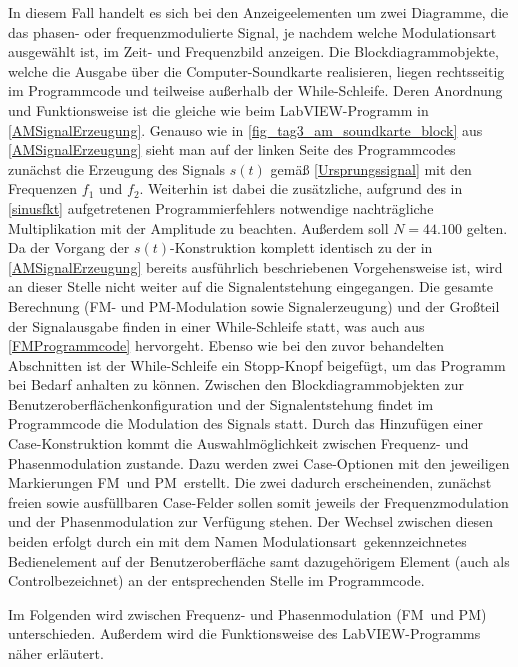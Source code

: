 \documentclass[
a4paper,
12pt,
pagesize,
ngerman
]{scrartcl}
\begin{document}
	\noindent In diesem Fall handelt es sich bei den Anzeigeelementen um zwei Diagramme, die das phasen- oder frequenzmodulierte Signal, je nachdem welche Modulationsart ausgewählt ist, im Zeit- und Frequenzbild anzeigen. 
	Die Blockdiagrammobjekte, welche die Ausgabe über die Computer-Soundkarte realisieren, liegen rechtsseitig im Programmcode und teilweise außerhalb der While-Schleife. 
	Deren Anordnung und Funktionsweise ist die gleiche wie beim LabVIEW-Programm in \cref{AMSignalErzeugung}. 
	Genauso wie in \cref{fig_tag3_am_soundkarte_block} aus \cref{AMSignalErzeugung} sieht man auf der linken Seite des Programmcodes zunächst die Erzeugung des Signals $s(t)$ gemäß \cref{Ursprungssignal} mit den Frequenzen $f_1$ und $f_2$. 
	Weiterhin ist dabei die zusätzliche, aufgrund des in \cref{sinusfkt} aufgetretenen Programmierfehlers notwendige nachträgliche Multiplikation mit der Amplitude zu beachten. 
	Außerdem soll $N = 44.100$ gelten. 
	Da der Vorgang der $s(t)$-Konstruktion komplett identisch zu der in \cref{AMSignalErzeugung} bereits ausführlich beschriebenen Vorgehensweise ist, wird an dieser Stelle nicht weiter auf die Signalentstehung eingegangen. 
	Die gesamte Berechnung (FM- und PM-Modulation sowie Signalerzeugung) und der Großteil der Signalausgabe finden in einer While-Schleife statt, was auch aus \cref{FMProgrammcode} hervorgeht.
	Ebenso wie bei den zuvor behandelten Abschnitten ist der While-Schleife ein \glqq Stopp\grqq -Knopf beigefügt, um das Programm bei Bedarf anhalten zu können.
	Zwischen den Blockdiagrammobjekten zur Benutzeroberflächenkonfiguration und der Signalentstehung findet im Programmcode die Modulation des Signals statt.
	Durch das Hinzufügen einer Case-Konstruktion kommt die Auswahlmöglichkeit zwischen Frequenz- und Phasenmodulation zustande.
	Dazu werden zwei Case-Optionen mit den jeweiligen Markierungen \glqq FM\grqq\ und \glqq PM\grqq\ erstellt. 
	Die zwei dadurch erscheinenden, zunächst freien sowie ausfüllbaren Case-Felder sollen somit jeweils der Frequenzmodulation und der Phasenmodulation zur Verfügung stehen.
	Der Wechsel zwischen diesen beiden erfolgt durch ein mit dem Namen \glqq Modulationsart\grqq\ gekennzeichnetes Bedienelement auf der Benutzeroberfläche samt dazugehörigem Element (auch als \glqq Control\grqq bezeichnet) an der entsprechenden Stelle im Programmcode.
		
	Im Folgenden wird zwischen Frequenz- und Phasenmodulation (\glqq FM\grqq\ und \glqq PM\grqq ) unterschieden.
	Außerdem wird die Funktionsweise des LabVIEW-Programms näher erläutert.
	
\end{document}
